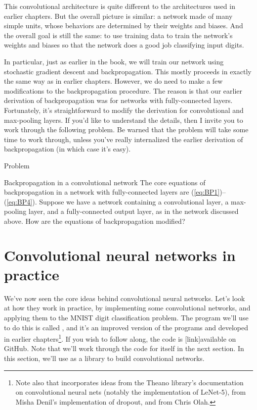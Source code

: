 \documentclass[a4paper,twoside,10pt]{book}
\begin{document}
This convolutional architecture is quite different to the architectures used in earlier chapters. But the overall picture is similar: a network made of many simple units, whose behaviors are determined by their weights and biases. And the overall goal is still the same: to use training data to train the network's weights and biases so that the network does a good job classifying input digits.

In particular, just as earlier in the book, we will train our network using stochastic gradient descent and backpropagation. This mostly proceeds in exactly the same way as in earlier chapters. However, we do need to make a few modifications to the backpropagation procedure. The reason is that our earlier derivation of backpropagation was for networks with fully-connected layers. Fortunately, it's straightforward to modify the derivation for convolutional and max-pooling layers. If you'd like to understand the details, then I invite you to work through the following problem. Be warned that the problem will take some time to work through, unless you've really internalized the earlier derivation of backpropagation (in which case it's easy).

\begin{exercize}{Problem}
	\item Backpropagation in a convolutional network The core equations of backpropagation in a network with fully-connected layers are (\ref{eq:BP1})--(\ref{eq:BP4}). Suppose we have a network containing a convolutional layer, a max-pooling layer, and a fully-connected output layer, as in the network discussed above. How are the equations of backpropagation modified?
\end{exercize}
\section{Convolutional neural networks in practice}
We've now seen the core ideas behind convolutional neural networks. Let's look at how they work in practice, by implementing some convolutional networks, and applying them to the MNIST digit classification problem. The program we'll use to do this is called , and it's an improved version of the programs  and  developed in earlier chapters\footnote{Note also that  incorporates ideas from the Theano library's documentation on convolutional neural nets (notably the implementation of LeNet-5), from Misha Denil's implementation of dropout, and from Chris Olah.}. If you wish to follow along, the code is [link]available on GitHub. Note that we'll work through the code for  itself in the next section. In this section, we'll use  as a library to build convolutional networks.
\end{document}
